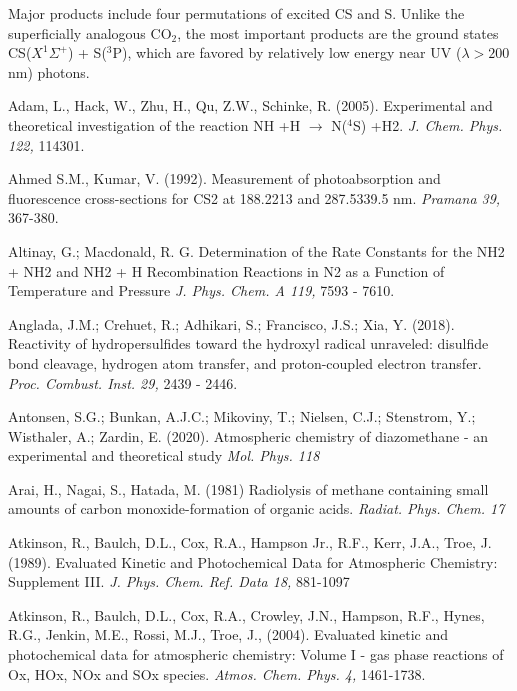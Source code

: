 \documentclass[12pt,landscape]{article}
\newcounter{reaction}
\newcounter{photo}
\begin{document}
 Major products include four permutations of excited CS and S.
Unlike the superficially analogous CO$_2$, the most important products are the ground states CS($X^1\Sigma^+$) + S($^3$P),
which are favored by relatively low energy near UV ($\lambda \!>\!200$ nm) photons.


\medskip
\medskip


Adam, L., Hack, W., Zhu, H., Qu, Z.W., Schinke, R. (2005). Experimental and theoretical investigation of the reaction NH +H $\rightarrow$ N($^4$S) +H2. {\em J. Chem. Phys. 122,} 114301.

Ahmed S.M., Kumar, V. (1992). Measurement of photoabsorption and fluorescence cross-sections for CS2 at 188.2213 and 287.5339.5 nm. {\em Pramana 39,} 367-380.

Altinay, G.; Macdonald, R. G.
Determination of the Rate Constants for the NH2 + NH2 and NH2 + H Recombination Reactions in N2 as a Function of Temperature and Pressure
{\em J. Phys. Chem. A 119,} 7593 - 7610.

Anglada, J.M.; Crehuet, R.; Adhikari, S.; Francisco, J.S.; Xia, Y. (2018).
 Reactivity of hydropersulfides toward the hydroxyl radical unraveled: disulfide bond cleavage, hydrogen atom transfer, and proton-coupled electron transfer.
 {\em Proc. Combust. Inst. 29,}  2439 - 2446.

Antonsen, S.G.; Bunkan, A.J.C.; Mikoviny, T.; Nielsen, C.J.; Stenstrom, Y.; Wisthaler, A.; Zardin, E. (2020).
Atmospheric chemistry of diazomethane - an experimental and theoretical study
{\em Mol. Phys. 118}

 Arai, H., Nagai, S., Hatada, M. (1981) Radiolysis of methane containing small amounts of carbon monoxide-formation of organic acids.  {\em Radiat. Phys. Chem.  17}

Atkinson, R., Baulch, D.L., Cox, R.A., Hampson Jr., R.F., Kerr, J.A., Troe, J. (1989). Evaluated Kinetic and Photochemical Data for Atmospheric Chemistry: Supplement III.  {\em J. Phys. Chem. Ref. Data 18,}  881-1097

Atkinson, R., Baulch, D.L., Cox, R.A., Crowley, J.N., Hampson, R.F., Hynes, R.G., Jenkin, M.E., Rossi, M.J., Troe, J., (2004). Evaluated kinetic and photochemical data for atmospheric chemistry: Volume I - gas phase reactions of Ox, HOx, NOx and SOx species.  {\em Atmos. Chem. Phys.  4,} 1461-1738.
\end{document}
